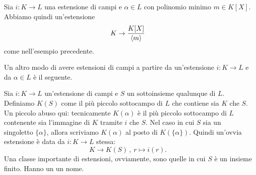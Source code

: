 \begin{cons}
Sia $i : K \to L$ una estensione di campi e $\alpha \in L$ con polinomio minimo $m \in K[X]$. Abbiamo quindi un'estensione
\[K \to \frac{K[X]}{\left\langle m\right\rangle}\]
come nell'esempio precedente.
\end{cons}

Un altro modo di avere estensioni di campi a partire da un'estensione $i : K \to L$ e da $\alpha \in L$ è il seguente.

\begin{cons}
Sia $i : K \to L$ un'estensione di campi e $S$ un sottoinsieme qualunque di $L$. Definiamo $K(S)$ come il più piccolo sottocampo di $L$ che contiene sia $K$ che $S$. Un piccolo abuso qui: tecnicamente $K(\alpha)$ è il più piccolo sottocampo di $L$ contenente sia l'immagine di $K$ tramite $i$ che $S$. Nel caso in cui $S$ sia un singoletto $\{\alpha\}$, allora scriviamo $K(\alpha)$ al posto di $K(\{\alpha\})$. Quindi un'ovvia estensione è data da $i : K \to L$ stessa:
\[K \to K(S)\,,\ r \mapsto i(r) .\]
Una classe importante di estensioni, ovviamente, sono quelle in cui $S$ è un insieme finito. Hanno un un nome.
\end{cons}

